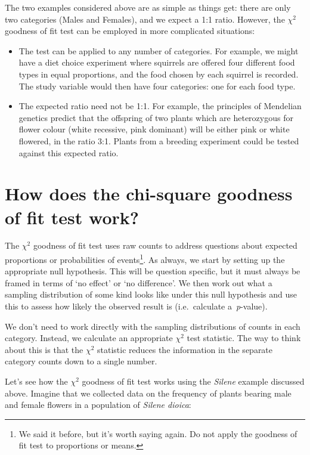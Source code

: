 \documentclass[
]{book}
\begin{document}
The two examples considered above are as simple as things get: there are only two categories (Males and Females), and we expect a 1:1 ratio. However, the \(\chi^{2}\) goodness of fit test can be employed in more complicated situations:

\begin{itemize}
\item
  The test can be applied to any number of categories. For example, we might have a diet choice experiment where squirrels are offered four different food types in equal proportions, and the food chosen by each squirrel is recorded. The study variable would then have four categories: one for each food type.
\item
  The expected ratio need not be 1:1. For example, the principles of Mendelian genetics predict that the offspring of two plants which are heterozygous for flower colour (white recessive, pink dominant) will be either pink or white flowered, in the ratio 3:1. Plants from a breeding experiment could be tested against this expected ratio.
\end{itemize}

\hypertarget{how-does-the-chi-square-goodness-of-fit-test-work}{%
\section{How does the chi-square goodness of fit test work?}\label{how-does-the-chi-square-goodness-of-fit-test-work}}

The \(\chi^{2}\) goodness of fit test uses raw counts to address questions about expected proportions or probabilities of events\footnote{We said it before, but it's worth saying again. Do not apply the goodness of fit test to proportions or means.}. As always, we start by setting up the appropriate null hypothesis. This will be question specific, but it must always be framed in terms of `no effect' or `no difference'. We then work out what a sampling distribution of some kind looks like under this null hypothesis and use this to assess how likely the observed result is (i.e.~calculate a~\emph{p}-value).

We don't need to work directly with the sampling distributions of counts in each category. Instead, we calculate an appropriate \(\chi^{2}\) test statistic. The way to think about this is that the \(\chi^{2}\) statistic reduces the information in the separate category counts down to a single number.

Let's see how the \(\chi^{2}\) goodness of fit test works using the \emph{Silene} example discussed above. Imagine that we collected data on the frequency of plants bearing male and female flowers in a population of \emph{Silene dioica}:
\end{document}
